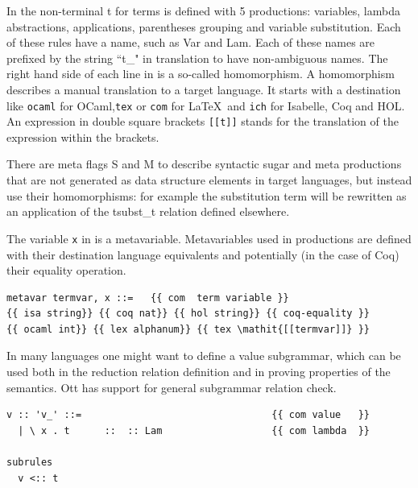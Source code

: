 \documentclass[12pt,twoside,notitlepage]{report}
\theoremstyle{plain}%
\theoremstyle{definition}
\theoremstyle{remark}
\begin{document}
In  the non-terminal t for terms is defined with 5 productions: variables, lambda abstractions, applications, parentheses grouping and variable substitution. Each of these rules have a name, such as Var and Lam. Each of these names are prefixed by the string ``t\_" in translation to have non-ambiguous names. The right hand side of each line in  is a so-called homomorphism. A homomorphism describes a manual translation to a target language.  \label{sec:ott_homo} It starts with a destination like \lstinline[language={Ott}]|ocaml| for OCaml,\lstinline[language={Ott}]|tex| or \lstinline[language={Ott}]|com| for \LaTeX\, and \lstinline[language={Ott}]|ich| for Isabelle, Coq and HOL. An expression in double square brackets \lstinline[language={Ott}]|[[t]]| stands for the translation of the expression within the brackets. 

There are meta flags S and M to describe syntactic sugar and meta productions that are not generated as data structure elements in target languages, but instead use their homomorphisms: for example the substitution term will be rewritten as an application of the tsubst\_t relation defined elsewhere. 

The variable \lstinline[language={Ott}]|x| in  is a metavariable. Metavariables used in productions are defined with their destination language equivalents and potentially (in the case of Coq) their equality operation.

\begin{lstlisting}[language={Ott}, caption={Ott metavariable definition}]
metavar termvar, x ::=   {{ com  term variable }} 
{{ isa string}} {{ coq nat}} {{ hol string}} {{ coq-equality }}
{{ ocaml int}} {{ lex alphanum}} {{ tex \mathit{[[termvar]]} }}
\end{lstlisting}

In many languages one might want to define a value subgrammar, which can be used both in the reduction relation definition and in proving properties of the semantics. Ott has support for general subgrammar relation check.

\begin{lstlisting}[language={Ott}, caption={Ott value subgrammar example}, label={lst:ottvaluesubgrammarexample}]
v :: 'v_' ::=                                 {{ com value   }}
  | \ x . t      ::  :: Lam                   {{ com lambda  }}
  
subrules
  v <:: t
\end{lstlisting}
\end{document}

